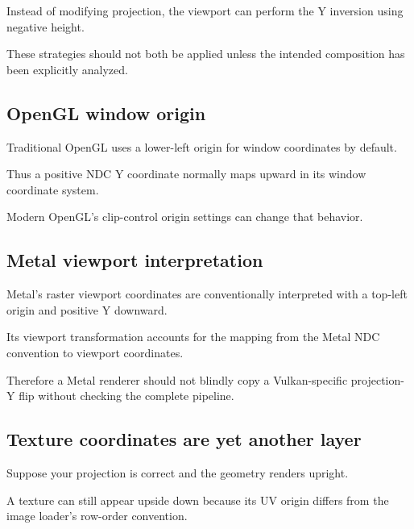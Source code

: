 Instead of modifying projection, the viewport can perform the Y inversion using negative height.

These strategies should not both be applied unless the intended composition has been explicitly analyzed.

\subsection{OpenGL window origin}\label{02-foundations-ii-ch033-opengl-window-origin}

\hypertarget{02-foundations-ii-ch033-opengl-window-origin}{}

Traditional OpenGL uses a lower-left origin for window coordinates by default.

Thus a positive NDC Y coordinate normally maps upward in its window coordinate system.

Modern OpenGL's clip-control origin settings can change that behavior.

\subsection{Metal viewport interpretation}\label{02-foundations-ii-ch033-metal-viewport-interpretation}

\hypertarget{02-foundations-ii-ch033-metal-viewport-interpretation}{}

Metal's raster viewport coordinates are conventionally interpreted with a top-left origin and positive Y downward.

Its viewport transformation accounts for the mapping from the Metal NDC convention to viewport coordinates.

Therefore a Metal renderer should not blindly copy a Vulkan-specific projection-Y flip without checking the complete pipeline.

\subsection{Texture coordinates are yet another layer}\label{02-foundations-ii-ch033-texture-coordinates-are-yet-another-layer}

\hypertarget{02-foundations-ii-ch033-texture-coordinates-are-yet-another-layer}{}

Suppose your projection is correct and the geometry renders upright.

A texture can still appear upside down because its UV origin differs from the image loader's row-order convention.


